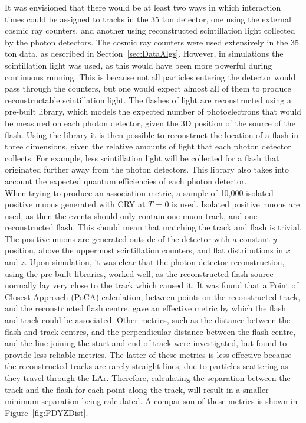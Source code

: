 It was envisioned that there would be at least two ways in which interaction times could be assigned to tracks in the 35 ton detector, one using the external cosmic ray counters, and another using reconstructed scintillation light collected by the photon detectors. The cosmic ray counters were used extensively in the 35 ton data, as described in Section~\ref{sec:DataAlgs}. However, in simulations the scintillation light was used, as this would have been more powerful during continuous running. This is because not all particles entering the detector would pass through the counters, but one would expect almost all of them to produce reconstructable scintillation light. The flashes of light are reconstructed using a pre-built library, which models the expected number of photoelectrons that would be measured on each photon detector, given the 3D position of the source of the flash. Using the library it is then possible to reconstruct the location of a flash in three dimensions, given the relative amounts of light that each photon detector collects. For example, less scintillation light will be collected for a flash that originated further away from the photon detectors. This library also takes into account the expected quantum efficiencies of each photon detector. \\

When trying to produce an association metric, a sample of 10,000 isolated positive muons generated with CRY at $T$ = 0 is used. Isolated positive muons are used, as then the events should only contain one muon track, and one reconstructed flash. This should mean that matching the track and flash is trivial. The positive muons are generated outside of the detector with a constant $y$ position, above the uppermost scintillation counters, and flat distributions in $x$ and $z$. Upon simulation, it was clear that the photon detector reconstruction, using the pre-built libraries, worked well, as the reconstructed flash source normally lay very close to the track which caused it. It was found that a Point of Closest Approach (PoCA) calculation, between points on the reconstructed track, and the reconstructed flash centre, gave an effective metric by which the flash and track could be associated. Other metrics, such as the distance between the flash and track centres, and the perpendicular distance between the flash centre, and the line joining the start and end of track were investigated, but found to provide less reliable metrics. The latter of these metrics is less effective because the reconstructed tracks are rarely straight lines, due to particles scattering as they travel through the LAr. Therefore, calculating the separation between the track and the flash for each point along the track, will result in a smaller minimum separation being calculated. A comparison of these metrics is shown in Figure~\ref{fig:PDYZDist}. \\

